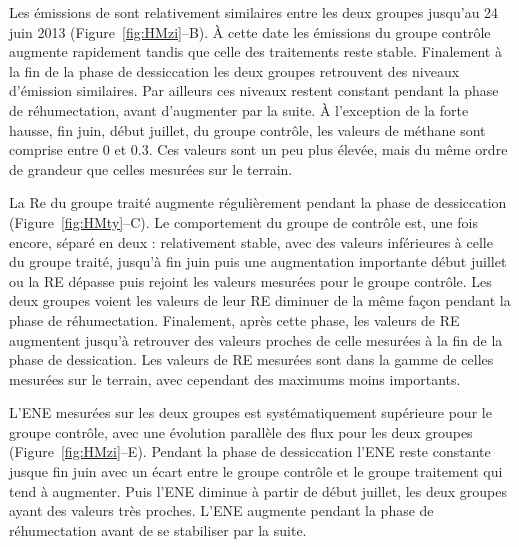 Les émissions de \chh sont relativement similaires entre les deux groupes jusqu'au 24 juin 2013 (Figure~\ref{fig:HMzi}--B).
À cette date les émissions du groupe contrôle augmente rapidement tandis que celle des traitements reste stable.
Finalement à la fin de la phase de dessiccation les deux groupes retrouvent des niveaux d'émission similaires.
Par ailleurs ces niveaux restent constant pendant la phase de réhumectation, avant d'augmenter par la suite.
À l'exception de la forte hausse, fin juin, début juillet, du groupe contrôle, les valeurs de méthane sont comprise entre 0 et \SI{0.3}{\uml}.
Ces valeurs sont un peu plus élevée, mais du même ordre de grandeur que celles mesurées sur le terrain.


La Re du groupe traité augmente régulièrement pendant la phase de dessiccation (Figure~\ref{fig:HMty}--C).
Le comportement du groupe de contrôle est, une fois encore, séparé en deux : relativement stable, avec des valeurs inférieures à celle du groupe traité, jusqu'à fin juin puis une augmentation importante début juillet ou la RE dépasse puis rejoint les valeurs mesurées pour le groupe contrôle.
Les deux groupes voient les valeurs de leur RE diminuer de la même façon pendant la phase de réhumectation.
Finalement, après cette phase, les valeurs de RE augmentent jusqu'à retrouver des valeurs proches de celle mesurées à la fin de la phase de dessication.
Les valeurs de RE mesurées sont dans la gamme de celles mesurées sur le terrain, avec cependant des maximums moins importants.


L'ENE mesurées sur les deux groupes est systématiquement supérieure pour le groupe contrôle, avec une évolution parallèle des flux pour les deux groupes (Figure~\ref{fig:HMzi}--E).
Pendant la phase de dessiccation l'ENE reste constante jusque fin juin avec un écart entre le groupe contrôle et le groupe traitement qui tend à augmenter.
Puis l'ENE diminue à partir de début juillet, les deux groupes ayant des valeurs très proches.
L'ENE augmente pendant la phase de réhumectation avant de se stabiliser par la suite.

